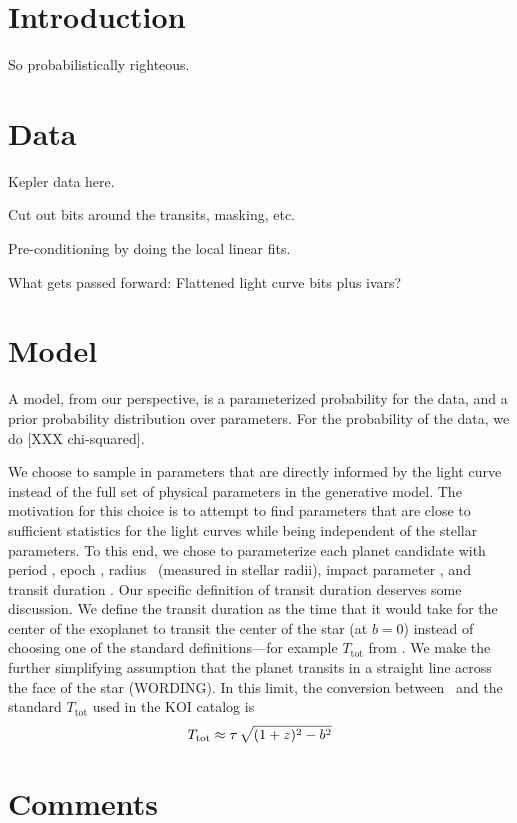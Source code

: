 \documentclass[12pt,preprint]{aastex}
\begin{document}
\section{Introduction}

So probabilistically righteous.

\section{Data}

Kepler data here.

Cut out bits around the transits, masking, etc.

Pre-conditioning by doing the local linear fits.

What gets passed forward:  Flattened light curve bits plus ivars?

\section{Model}

A model, from our perspective,
is a parameterized probability for the data,
and a prior probability distribution over parameters.
For the probability of the data, we do [XXX chi-squared].

We choose to sample in parameters that are directly informed by the light
curve instead of the full set of physical parameters in the generative model.
The motivation for this choice is to attempt to find parameters that are close
to sufficient statistics for the light curves while being independent of the
stellar parameters.
To this end, we chose to parameterize each planet candidate with period
\period, epoch \epoch, radius \ror\ (measured in stellar radii), impact
parameter \impact, and transit duration \duration.
Our specific definition of transit duration deserves some discussion.
We define the transit duration as the time that it would take for the
center of the exoplanet to transit the center of the star (at $b=0$) instead
of choosing one of the standard definitions---for example $T_\mathrm{tot}$
from \citet{winn}.
We make the further simplifying assumption that the planet transits in a
straight line across the face of the star (WORDING).
In this limit, the conversion between \duration\ and the standard
$T_\mathrm{tot}$ used in the KOI catalog is
\begin{eqnarray}
T_\mathrm{tot} \approx \tau \, \sqrt{(1+z)^2 - b^2}
\end{eqnarray}

\section{Comments}
\end{document}
